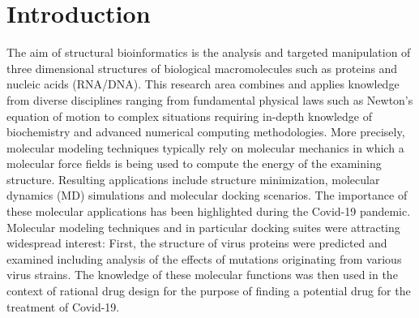 \section{Introduction}


The aim of structural bioinformatics is the analysis and targeted manipulation of three dimensional structures of biological macromolecules such as proteins and nucleic acids (RNA/DNA). This research area combines and applies knowledge from diverse disciplines ranging from fundamental physical laws such as Newton's equation of motion to complex situations requiring in-depth knowledge of biochemistry and advanced numerical computing methodologies. More precisely, molecular modeling techniques typically rely on molecular mechanics in which a molecular force fields is being used to compute the energy of the examining structure.  
Resulting applications include structure minimization, molecular dynamics (MD) simulations and molecular docking scenarios. 
The importance of these molecular applications has been highlighted during the Covid-19 pandemic. Molecular modeling techniques and in particular docking suites were attracting widespread interest: First, the structure of virus proteins were predicted and examined including analysis of the effects of mutations originating from various virus strains. The knowledge of these molecular functions was then used in the context of rational drug design for the purpose of finding a potential drug for the treatment of Covid-19. \\

